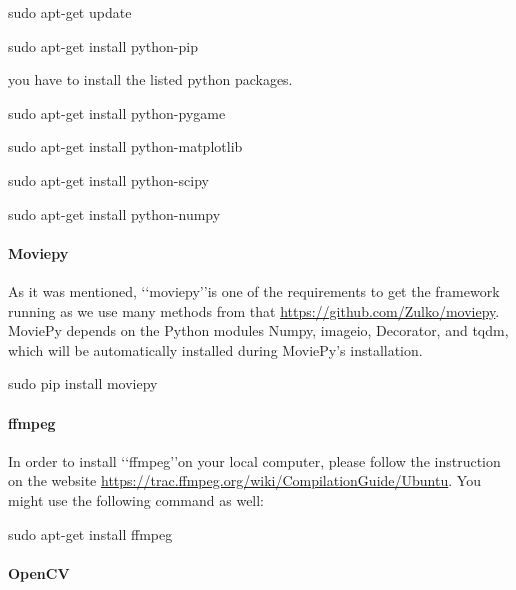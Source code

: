 \documentclass[[12pt,DIV14,BCOR12mm,a4paper,footexclude,headinclude,halfparskip-,twoside,openright,cleardoubleempty,idxtotoc,bibtotoc]{article}
\begin{document}
\begin{framed}

sudo apt-get update

sudo apt-get install python-pip

\end{framed}

you have to install the listed python packages.


\begin{framed}

sudo apt-get install python-pygame


sudo apt-get install python-matplotlib 


sudo apt-get install python-scipy


sudo apt-get install python-numpy

\end{framed}

\paragraph{Moviepy}

As it was mentioned, \lq\lq moviepy\rq\rq is one of the requirements to get the framework running as we use many methods from that \url{https://github.com/Zulko/moviepy}.
MoviePy depends on the Python modules Numpy, imageio, Decorator, and tqdm, which will be automatically installed during MoviePy's installation. 

\begin{framed}

sudo pip install moviepy

\end{framed}


\paragraph{ffmpeg}

In order to install \lq\lq ffmpeg\rq\rq on your local computer, please follow the instruction on the website \url{https://trac.ffmpeg.org/wiki/CompilationGuide/Ubuntu}. You might use the following command as well:

\begin{framed}


sudo apt-get install ffmpeg

\end{framed}


\paragraph{OpenCV}
\end{document}
